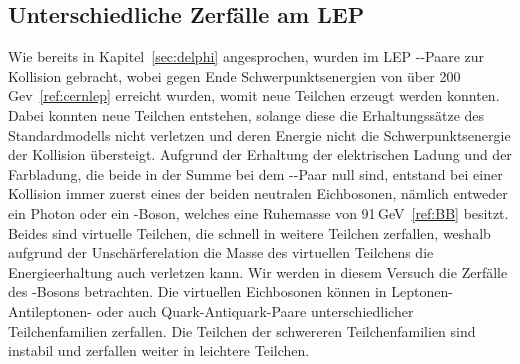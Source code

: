 \documentclass[a4paper,ngerman]{scrartcl}
\begin{document}
\subsection{Unterschiedliche Zerfälle am LEP}
\label{sec:zerfaelle}
Wie bereits in Kapitel~\ref{sec:delphi} angesprochen, wurden im LEP \Pelectron-\APelectron-Paare zur Kollision gebracht, wobei gegen Ende Schwerpunktsenergien von über 200\,Gev~\ref{ref:cernlep} erreicht wurden,
womit neue Teilchen erzeugt werden konnten.
Dabei konnten neue Teilchen entstehen, 
solange diese die Erhaltungssätze des Standardmodells nicht verletzen 
und deren Energie nicht die Schwerpunktsenergie der Kollision übersteigt.
Aufgrund der Erhaltung der elektrischen Ladung und der Farbladung, 
die beide in der Summe bei dem \Pelectron-\APelectron-Paar null sind,
entstand bei einer Kollision immer zuerst eines der beiden neutralen Eichbosonen,
nämlich entweder ein Photon oder ein \PZzero-Boson,
welches eine Ruhemasse von 91\,GeV~\ref{ref:BB} besitzt.
Beides sind virtuelle Teilchen, die schnell in weitere Teilchen zerfallen,
weshalb aufgrund der Unschärferelation die Masse des virtuellen
Teilchens die Energieerhaltung auch verletzen kann.
Wir werden in diesem Versuch die Zerfälle des \PZzero-Bosons betrachten.
Die virtuellen Eichbosonen können in Leptonen-Antileptonen- oder auch 
Quark-Antiquark-Paare unterschiedlicher Teilchenfamilien zerfallen. 
Die Teilchen der schwereren Teilchenfamilien sind instabil und
zerfallen weiter in leichtere Teilchen.\\
\end{document}
